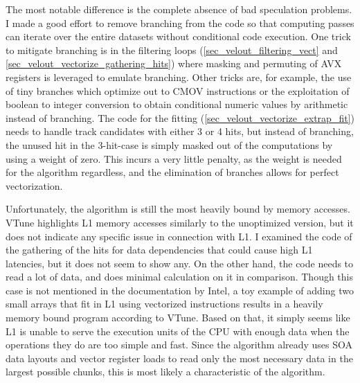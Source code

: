 \documentclass[12pt]{article}
\begin{document}
The most notable difference is the complete absence of bad speculation problems. I made a good effort to remove branching from the code so that computing passes can iterate over the entire datasets without conditional code execution. One trick to mitigate branching is in the filtering loops (\ref{sec_velout_filtering_vect} and \ref{sec_velout_vectorize_gathering_hits}) where masking and permuting of AVX registers is leveraged to emulate branching. Other tricks are, for example, the use of tiny branches which optimize out to CMOV instructions or the exploitation of boolean to integer conversion to obtain conditional numeric values by arithmetic instead of branching. The code for the fitting (\ref{sec_velout_vectorize_extrap_fit}) needs to handle track candidates with either 3 or 4 hits, but instead of branching, the unused hit in the 3-hit-case is simply masked out of the computations by using a weight of zero. This incurs a very little penalty, as the weight is needed for the algorithm regardless, and the elimination of branches allows for perfect vectorization.

\vspace{1pc}

Unfortunately, the algorithm is still the most heavily bound by memory accesses. VTune highlights L1 memory accesses similarly to the unoptimized version, but it does not indicate any specific issue in connection with L1. I examined the code of the gathering of the hits for data dependencies that could cause high L1 latencies, but it does not seem to show any. On the other hand, the code needs to read a lot of data, and does minimal calculation on it in comparison. Though this case is not mentioned in the documentation by Intel, a toy example of adding two small arrays that fit in L1 using vectorized instructions results in a heavily memory bound program according to VTune. Based on that, it simply seems like L1 is unable to serve the execution units of the CPU with enough data when the operations they do are too simple and fast. Since the algorithm already uses SOA data layouts and vector register loads to read only the most necessary data in the largest possible chunks, this is most likely a characteristic of the algorithm.


\vspace{1pc}
\end{document}
